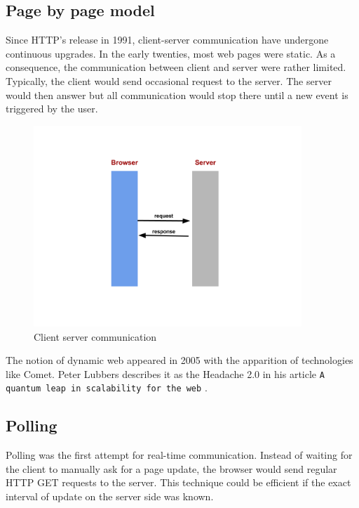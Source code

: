 \subsection{Page by page model}

Since HTTP's release in 1991, client-server communication have undergone
continuous upgrades. In the early twenties, most web pages were static. As a
consequence, the communication between client and server  were rather limited.
Typically, the client would send occasional request to the server. The server
would then answer but all communication would stop there until a new event is
triggered by the user.\\ 


\begin{figure}[H]
\centering
\includegraphics[width=0.9\textwidth]{./Figures/client_server_communication.png}
\caption[clientServerCommunication]{Client server communication}
\label{fig:client_server_communication}
\end{figure}

The notion of dynamic web appeared in 2005 with the apparition of technologies
like Comet. Peter Lubbers describes it as the Headache 2.0 in his article
\texttt{A quantum leap in scalability for the web} \citep{Reference32}.\\

\subsection{Polling}

Polling was the first attempt for real-time communication. Instead of waiting
for the client to manually ask for a page update, the browser would send regular
HTTP GET requests to the server. This technique could be efficient if the exact
interval of update on the server side was known.\\

